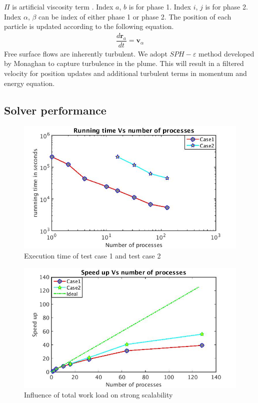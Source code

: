 \documentclass[conference,compsoc]{IEEEtran}
\begin{document}
$\Pi$ is artificial viscosity term \cite{monaghan1992smoothed}.
Index $a$, $b$ is for phase 1.
Index $i$, $j$ is for phase 2.
Index $\alpha$, $\beta$ can be index of either phase 1 or phase 2.
The position of each particle is updated according to the following equation.
\begin{align}
\dfrac{d \textbf{r}_a}{dt} = \textbf{v}_{\alpha} \label{eq:gov-update-pos}
\end{align}
Free surface flows are inherently turbulent. We adopt $SPH-\varepsilon$ method developed by Monaghan\cite{monaghan2011turbulence} to capture turbulence in the plume. This will result in a filtered velocity for position updates and additional turbulent terms in momentum and energy equation.
\subsection{Solver performance}
\begin{figure}[!t]
\centering
\includegraphics[scale=0.33]{2cases_time}
\caption{Execution time of test case 1 and test case 2}
\label{fig:2cases_time}
\end{figure}
%
\begin{figure}[!t]
\centering
\includegraphics[scale=0.33]{2cases_efficiency}
\caption{Influence of total work load on strong scalability}
\label{fig:2cases_efficiency}
\end{figure}
\end{document}
